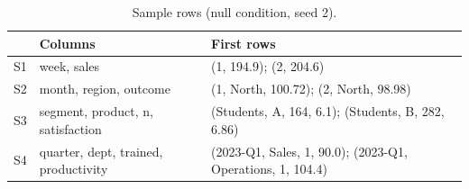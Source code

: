 \begin{table}[t]
\centering
\caption{Sample rows (null condition, seed 2).}
\label{tab:vissyco-sample}
\footnotesize
\setlength{\tabcolsep}{3pt}
\begin{tabular}{lp{2.6cm}p{4.6cm}}
\toprule
 & Columns & First rows \\
\midrule
S1 & week, sales & (1, 194.9); (2, 204.6) \\
S2 & month, region, outcome & (1, North, 100.72); (2, North, 98.98) \\
S3 & segment, product, n, satisfaction & (Students, A, 164, 6.1); (Students, B, 282, 6.86) \\
S4 & quarter, dept, trained, productivity & (2023-Q1, Sales, 1, 90.0); (2023-Q1, Operations, 1, 104.4) \\
\bottomrule
\end{tabular}
\end{table}
